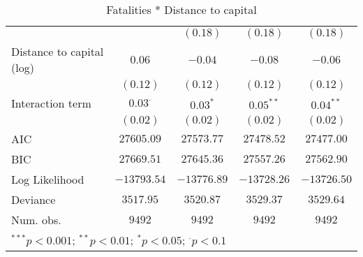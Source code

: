 \begin{sidewaystable}
\begin{center}
{\begin{tabular}{l c c c c}
                                         &                & $(0.18)$      & $(0.18)$        & $(0.18)$        \\
Distance to capital (log)                & $0.06$         & $-0.04$       & $-0.08$         & $-0.06$         \\
                                         & $(0.12)$       & $(0.12)$      & $(0.12)$        & $(0.12)$        \\
Interaction term                         & $0.03^{\cdot}$ & $0.03^{*}$    & $0.05^{**}$     & $0.04^{**}$     \\
                                         & $(0.02)$       & $(0.02)$      & $(0.02)$        & $(0.02)$        \\
\midrule
AIC                                      & $27605.09$     & $27573.77$    & $27478.52$      & $27477.00$      \\
BIC                                      & $27669.51$     & $27645.36$    & $27557.26$      & $27562.90$      \\
Log Likelihood                           & $-13793.54$    & $-13776.89$   & $-13728.26$     & $-13726.50$     \\
Deviance                                 & $3517.95$      & $3520.87$     & $3529.37$       & $3529.64$       \\
Num. obs.                                & $9492$         & $9492$        & $9492$          & $9492$          \\
\bottomrule
\multicolumn{5}{l}{\scriptsize{$^{***}p<0.001$; $^{**}p<0.01$; $^{*}p<0.05$; $^{\cdot}p<0.1$}}
\end{tabular}
}
\caption{Fatalities * Distance to capital}
\label{interaction_statebaseddeaths}
\end{center}
\end{sidewaystable}
